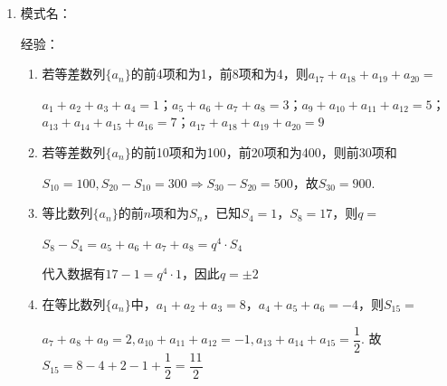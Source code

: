 \begin{enumerate}
\begin{enumerate}
\begin{jieda}
            所以 $\dfrac{{a}_{n}}{{b}_{n}} = \dfrac{{S}_{{2n} - 1}}{{T}_{{2n} - 1}} = \dfrac{5\left( {{2n} - 1}\right)  + {63}}{{2n} - 1 + 3} = \dfrac{{5n} + {29}}{n + 1} = 5 + \dfrac{24}{n + 1}$ 
            
            要使 $\dfrac{{a}_n}{b_n}$ 为整数,则 $n + 1$ 为 24 的因数,由于 $n + 1 \geq  2$ ,故 $n + 1$ 可以为2,3,4,6,8,12,24,故满足条件的正整数 $n$ 的个数为 7 个
        \end{jieda}
    \end{enumerate}

    \item 模式名：
    
    经验：
    \begin{enumerate}
        \item 若等差数列$\{a_n\}$的前4项和为1，前8项和为4，则$a_{17} + a_{18} +a_{19} +a_{20} = $
        \begin{jieda}
            $a_{1} + a_{2} +a_{3} +a_{4} = 1$；$a_{5} + a_{6} +a_{7} +a_{8} = 3$；$a_{9} + a_{10} +a_{11} +a_{12} = 5$；$a_{13} + a_{14} +a_{15} +a_{16} = 7$；$a_{17} + a_{18} +a_{19} +a_{20} = 9$
        \end{jieda}
        \item 若等差数列$\{a_n\}$的前10项和为100，前20项和为400，则前30项和
        \begin{jieda}
            $S_{10} = 100, S_{20} - S_{10} = 300 \Rightarrow S_{30} - S_{20} = 500$，故$S_{30} = 900$.
        \end{jieda}
            \item 等比数列$\{a_n\}$的前$n$项和为$S_n$，已知$S_4 = 1$，$S_8 = 17$，则$q=$
        \begin{jieda}
            $S_8 - S_4 = a_5+a_6+a_7+a_8 = q^4 \cdot S_4$
    
            代入数据有$17-1 = q^4 \cdot 1$，因此$q = \pm 2$
        \end{jieda}
        \item 在等比数列$\{a_n\}$中，$a_1 + a_2 + a_3 = 8$，$a_4 + a_5 + a_6 = -4$，则$S_{15} = $
        \begin{jieda}
            $a_7 + a_8 + a_9 = 2, a_{10} + a_{11} + a_{12} = -1, a_{13} + a_{14} + a_{15} = \dfrac{1}{2}$. 故$S_{15} = 8 - 4 + 2 - 1 + \dfrac{1}{2} = \dfrac{11}{2}$
        \end{jieda}
    \end{enumerate}


\end{enumerate}
